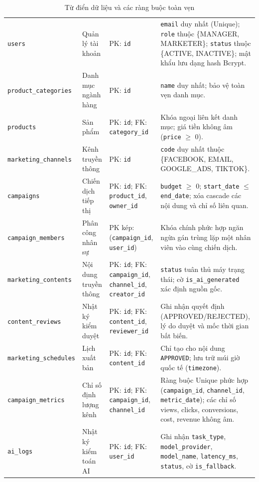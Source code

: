 \begin{table}[H]
\centering
\small
\caption{Từ điển dữ liệu và các ràng buộc toàn vẹn}\label{tab:v9-data-dictionary}
\begin{tabularx}{\textwidth}{|L{3.6cm}|L{2.4cm}|L{2.8cm}|Y|}
\hline
{} &  &  & \\
\hline
\texttt{users} & Quản lý tài khoản & PK: \texttt{id} & \texttt{email} duy nhất (Unique); \texttt{role} thuộc \{MANAGER, MARKETER\}; \texttt{status} thuộc \{ACTIVE, INACTIVE\}; mật khẩu lưu dạng hash Bcrypt.\\
\hline
\texttt{product\_categories} & Danh mục ngành hàng & PK: \texttt{id} & \texttt{name} duy nhất; bảo vệ toàn vẹn danh mục.\\
\hline
\texttt{products} & Sản phẩm & PK: \texttt{id}; FK: \texttt{category\_id} & Khóa ngoại liên kết danh mục; giá tiền không âm (\texttt{price} $\ge$ 0).\\
\hline
\texttt{marketing\_channels} & Kênh truyền thông & PK: \texttt{id} & \texttt{code} duy nhất thuộc \{FACEBOOK, EMAIL, GOOGLE\_ADS, TIKTOK\}.\\
\hline
\texttt{campaigns} & Chiến dịch tiếp thị & PK: \texttt{id}; FK: \texttt{product\_id}, \texttt{owner\_id} & \texttt{budget} $\ge$ 0; \texttt{start\_date} $\le$ \texttt{end\_date}; xóa cascade các nội dung và chỉ số liên quan.\\
\hline
\texttt{campaign\_members} & Phân công nhân sự & PK kép: (\texttt{campaign\_id}, \texttt{user\_id}) & Khóa chính phức hợp ngăn ngừa gán trùng lặp một nhân viên vào cùng chiến dịch.\\
\hline
\texttt{marketing\_contents} & Nội dung truyền thông & PK: \texttt{id}; FK: \texttt{campaign\_id}, \texttt{channel\_id}, \texttt{creator\_id} & \texttt{status} tuân thủ máy trạng thái; cờ \texttt{is\_ai\_generated} xác định nguồn gốc.\\
\hline
\texttt{content\_reviews} & Nhật ký kiểm duyệt & PK: \texttt{id}; FK: \texttt{content\_id}, \texttt{reviewer\_id} & Ghi nhận quyết định (APPROVED/REJECTED), lý do duyệt và mốc thời gian bất biến.\\
\hline
\texttt{marketing\_schedules} & Lịch xuất bản & PK: \texttt{id}; FK: \texttt{content\_id} & Chỉ tạo cho nội dung \texttt{APPROVED}; lưu trữ múi giờ quốc tế (\texttt{timezone}).\\
\hline
\texttt{campaign\_metrics} & Chỉ số định lượng kênh & PK: \texttt{id}; FK: \texttt{campaign\_id}, \texttt{channel\_id} & Ràng buộc Unique phức hợp (\texttt{campaign\_id}, \texttt{channel\_id}, \texttt{metric\_date}); các chỉ số views, clicks, conversions, cost, revenue không âm.\\
\hline
\texttt{ai\_logs} & Nhật ký kiểm toán AI & PK: \texttt{id}; FK: \texttt{user\_id} & Ghi nhận \texttt{task\_type}, \texttt{model\_provider}, \texttt{model\_name}, \texttt{latency\_ms}, \texttt{status}, cờ \texttt{is\_fallback}.\\
\hline
\end{tabularx}
\end{table}

